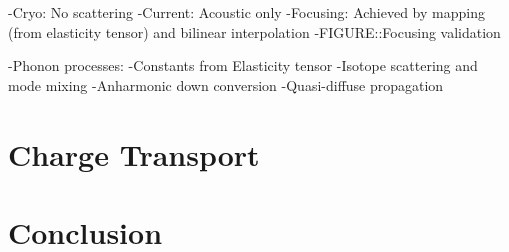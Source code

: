 \documentclass[preprint,12pt]{elsarticle}
\begin{document}
-Cryo: No scattering
-Current: Acoustic only
-Focusing: Achieved by mapping (from elasticity tensor) and bilinear interpolation
-FIGURE::Focusing validation

-Phonon processes:
  -Constants from Elasticity tensor
  -Isotope scattering and mode mixing
  -Anharmonic down conversion
  -Quasi-diffuse propagation



\section{Charge Transport}
\label{sec:ChareTransport}


\section{Conclusion}
\label{sec:Conclusion}













\end{document}
